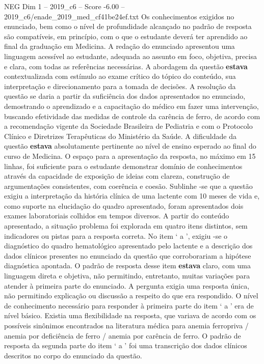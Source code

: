 \begin{textsample}{NEG Dim 1 – 2019\_c6 – Score -6.00 – 2019\_c6/enade\_2019\_med\_cf41be24ef.txt}
Os conhecimentos exigidos no enunciado, bem como o nível de profundidade alcançado no padrão de resposta são compatíveis, em princípio, com o que o estudante deverá ter aprendido ao final da graduação em Medicina.
A redação do enunciado apresentou uma linguagem acessível ao estudante, adequada ao assunto em foco, objetiva, precisa e clara, com todas as referências necessárias.
A abordagem da questão \textbf{estava} contextualizada com estímulo ao exame crítico do tópico do conteúdo, sua interpretação e direcionamento para a tomada de decisões.
A resolução da questão se daria a partir da suficiência dos dados apresentados no enunciado, demostrando o aprendizado e a capacitação do médico em fazer uma intervenção, buscando efetividade das medidas de controle da carência de ferro, de acordo com a recomendação vigente da Sociedade Brasileira de Pediatria e com o Protocolo Clínico e Diretrizes Terapêuticas do Ministério da Saúde.
A dificuldade da questão \textbf{estava} absolutamente pertinente ao nível de ensino esperado ao final do curso de Medicina.
O espaço para a apresentação da resposta, no máximo em 15 linhas, foi suficiente para o estudante demonstrar domínio de conhecimentos através da capacidade de exposição de ideias com clareza, construção de argumentações consistentes, com coerência e coesão.
Sublinhe -se que a questão exigiu a interpretação da história clínica de uma lactente com 10 meses de vida e, como suporte na elucidação do quadro apresentado, foram apresentados dois exames laboratoriais colhidos em tempos diversos.
A partir do conteúdo apresentado, a situação problema foi explorada em quatro itens distintos, sem indicadores ou pistas para a resposta correta.
No item ‘ a ’, exigiu -se o diagnóstico do quadro hematológico apresentado pelo lactente e a descrição dos dados clínicos presentes no enunciado da questão que corroborariam a hipótese diagnóstica apontada.
O padrão de resposta desse item \textbf{estava} claro, com uma linguagem direta e objetiva, não permitindo, entretanto, muitas variações para atender à primeira parte do enunciado.
A pergunta exigia uma resposta única, não permitindo explicação ou discussão a respeito do que era respondido.
O nível de conhecimento necessário para responder à primeira parte do item ‘ a ’ era de nível básico.
Existia uma flexibilidade na resposta, que variava de acordo com os possíveis sinônimos encontrados na literatura médica para anemia ferropriva / anemia por deficiência de ferro / anemia por carência de ferro.
O padrão de resposta da segunda parte do item ‘ a ’ foi uma transcrição dos dados clínicos descritos no corpo do enunciado da questão.

\end{textsample}
